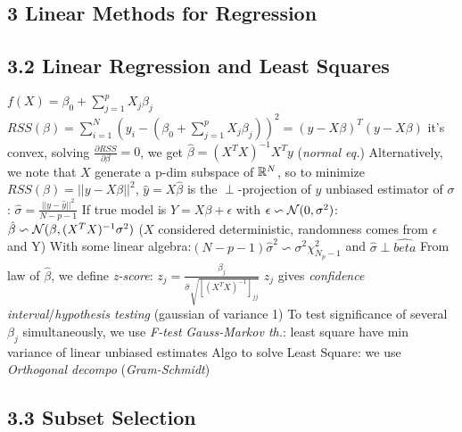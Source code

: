 \documentclass[9pt]{extarticle}
\begin{document}
\begin{multicols*}{2}
\section*{3 Linear Methods for Regression}

\subsection*{3.2 Linear Regression and Least Squares}

$f(X)=\beta_0+\sum_{j=1}^{p}X_j \beta_j$\nl
$RSS(\beta)=\sum_{i=1}^{N}(y_i-(\beta_0+\sum_{j=1}^{p}X_j \beta_j))^2=(y-X\beta)^T(y-X\beta)$\nl
it's convex, solving $\frac{\partial RSS}{\partial \beta}=0$, we get $\hat{\beta}=(X^TX)^{-1}X^Ty$ (\emph{normal eq.})\nl
Alternatively, we note that $X$ generate a p-dim subspace of $\mathbb{R}^N$, so to minimize $RSS(\beta)=||y-X\beta||^2$, $\hat{y}=X\hat{\beta}$ is the $\perp$-projection of $y$\nl
unbiased estimator of $\sigma$: $\hat{\sigma}=\frac{||y-\hat{y}||^2}{N-p-1}$\nl
If true model is $Y=X\beta + \epsilon$ with $\epsilon \backsim \mathcal{N}(0,\sigma^2)$:
$\hat{\beta} \backsim \mathcal{N}(\beta,(X^TX)^{-1}\sigma^2)$ ($X$ considered deterministic, randomness comes from $\epsilon$ and Y)\nl
With some linear algebra:$(N-p-1)\hat{\sigma}^2\backsim \sigma^2 \chi^2_{N_p-1}$ and $\hat{\sigma} \perp \hat{beta}$\nl
From law of $\hat{\beta}$, we define \emph{z-score}: $z_j=\frac{\hat{\beta}_j}{\hat{\sigma}\sqrt{[(X^TX)^{-1}]_{jj}}}$\nl
$z_j$ gives \emph{confidence interval}/\emph{hypothesis testing} (gaussian of variance 1)\nl
To test significance of several $\beta_j$ simultaneously, we use \emph{F-test}
\emph{Gauss-Markov th.}: least square have min variance of linear unbiased estimates\nl
Algo to solve Least Square: we use \emph{Orthogonal decompo} (\emph{Gram-Schmidt})\nl

\subsection*{3.3 Subset Selection}

\end{multicols*}
\end{document}
